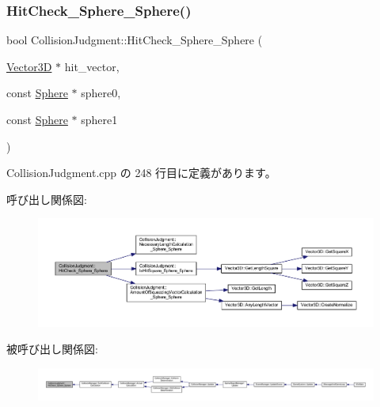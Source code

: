 \subsubsection{\texorpdfstring{Hit\+Check\+\_\+\+Sphere\+\_\+\+Sphere()}{HitCheck\_Sphere\_Sphere()}}
{\footnotesize\ttfamily bool Collision\+Judgment\+::\+Hit\+Check\+\_\+\+Sphere\+\_\+\+Sphere (\begin{DoxyParamCaption}\item[{\mbox{\hyperlink{class_vector3_d}{Vector3D}} $\ast$}]{hit\+\_\+vector,  }\item[{const \mbox{\hyperlink{class_sphere}{Sphere}} $\ast$}]{sphere0,  }\item[{const \mbox{\hyperlink{class_sphere}{Sphere}} $\ast$}]{sphere1 }\end{DoxyParamCaption})\hspace{0.3cm}{\ttfamily [static]}}



 Collision\+Judgment.\+cpp の 248 行目に定義があります。

呼び出し関係図\+:\nopagebreak
\begin{figure}[H]
\begin{center}
\leavevmode
\includegraphics[width=350pt]{class_collision_judgment_a21e4ce202f713f1b2a7fc593f4daf7d2_cgraph}
\end{center}
\end{figure}
被呼び出し関係図\+:
\nopagebreak
\begin{figure}[H]
\begin{center}
\leavevmode
\includegraphics[width=350pt]{class_collision_judgment_a21e4ce202f713f1b2a7fc593f4daf7d2_icgraph}
\end{center}
\end{figure}
\mbox{\label{class_collision_judgment_a2b4e851cf1fc45dca09175b36fb4f50c}} 

